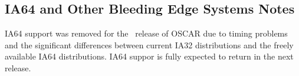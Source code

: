 
\subsection{IA64 and Other Bleeding Edge Systems Notes}
\label{subsec:ia64notes}

IA64 support was removed for the \oscarversion\ release of OSCAR due to
timing problems and the significant differences between current IA32
distributions and the freely available IA64 distributions.  IA64 suppor is
fully expected to return in the next release.

%
% 
%   
% 
% 
% 
% 

